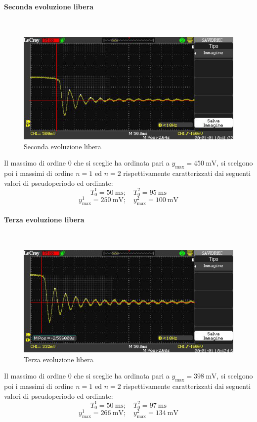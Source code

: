\documentclass[a4paper, 12pt, twoside]{report}
\begin{document}
\newpage	 	
	 	
	 	\paragraph{Seconda evoluzione libera} \mbox{} \\
	 	\begin{figure}[H]
	 		\centering
	 		\includegraphics[width=0.6\linewidth]{immaginioscillo/7+}
	 		\caption{Seconda evoluzione libera}
	 		\label{fig:12}
	 	\end{figure}
	 	Il massimo di ordine 0 che si sceglie ha ordinata pari a $y_{\max}=\SI{450}{\milli\volt}$, si scelgono poi i massimi di ordine $n=1$ ed $n=2$ rispettivamente caratterizzati dai seguenti valori di pseudoperiodo ed ordinate: 
	 	\[T^1_0=\SI{50}{\milli\second};\quad  T_0^2=\SI{95}{\milli\second}\]
	 	\[y^1_{\max}=\SI{250}{\milli\volt};\quad  y_{\max}^2=\SI{100}{\milli\volt}\]
	 
	 	
	 	\paragraph{Terza evoluzione libera} \mbox{} \\
	 	\begin{figure}[H]
	 		\centering
	 		\includegraphics[width=0.6\linewidth]{immaginioscillo/8+}
	 		\caption{Terza evoluzione libera}
	 		\label{fig:13}
	 	\end{figure}
	 	Il massimo di ordine 0 che si sceglie ha ordinata pari a $y_{\max}=\SI{398}{\milli\volt}$, si scelgono poi i massimi di ordine $n=1$ ed $n=2$ rispettivamente caratterizzati dai seguenti valori di pseudoperiodo ed ordinate:
	 	\[T^1_0=\SI{50}{\milli\second};\quad  T_0^2=\SI{97}{\milli\second}\]
	 	\[y^1_{\max}=\SI{266}{\milli\volt};\quad  y_{\max}^2=\SI{134}{\milli\volt}\]
\end{document}
